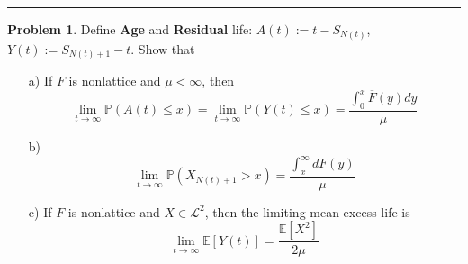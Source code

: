 \documentclass[a4paper, 10pt]{article}
\theoremstyle{definition}
\newtheorem{problem}{Problem}
\theoremstyle{hSol}
\begin{document}
\noindent\rule{16cm}{0.4pt}
\begin{problem} Define \textbf{Age} and \textbf{Residual} life: $A(t):=t-S_{N(t)}$, $Y(t):=S_{N(t)+1}-t$. Show that
\begin{itemize}
   \item[a)] If $F$ is nonlattice and $\mu<\infty$, then 
   $$
     \lim\limits_{t\rightarrow\infty}\mathbb{P}\left(A(t)\leq x\right) = \lim\limits_{t\rightarrow\infty}\mathbb{P}\left(Y(t)\leq x\right) = \frac{\int_0^x \overline{F}(y)dy}{\mu}
   $$
   \item[b)] 
   $$
    \lim\limits_{t\rightarrow\infty}\mathbb{P}\left(X_{N(t)+1}> x\right) = \frac{\int_x^{\infty} dF(y)}{\mu}
   $$
   \item[c)] If $F$ is nonlattice and $X\in \mathcal{L}^2$, then the limiting mean excess life is
   $$\lim\limits_{t\rightarrow\infty}\mathbb{E}\left[Y(t)\right]=\frac{\mathbb{E}\left[X^2\right]}{2\mu}$$
 \end{itemize} 
\end{problem}
\end{document}

